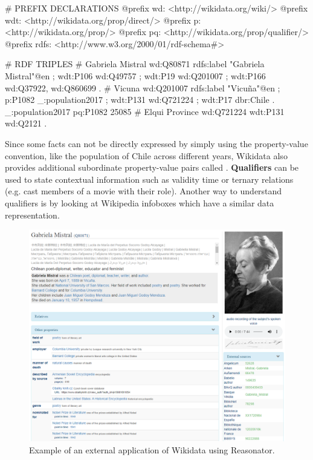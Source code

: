 \begin{sparqlcode}[%
    caption=Set of RDF triples about Gabriela Mistral in Wikidata., 
    label=lst:wikidataRdfExample]
# PREFIX DECLARATIONS
@prefix wd: <http://wikidata.org/wiki/>
@prefix wdt: <http://wikidata.org/prop/direct/>
@prefix p: <http://wikidata.org/prop/>
@prefix pq: <http://wikidata.org/prop/qualifier/>
@prefix rdfs: <http://www.w3.org/2000/01/rdf-schema#>

# RDF TRIPLES
# Gabriela Mistral
wd:Q80871 rdfs:label "Gabriela Mistral"@en ;
    wdt:P106 wd:Q49757 ;
    wdt:P19 wd:Q201007 ;
    wdt:P166 wd:Q37922, wd:Q860699 .
# Vicuna
wd:Q201007 rdfs:label "Vicuña"@en ;
    p:P1082 _:population2017 ;
    wdt:P131 wd:Q721224 ;
    wdt:P17 dbr:Chile .
_:population2017 pq:P1082 25085
# Elqui Province
wd:Q721224 wdt:P131 wd:Q2121 .
\end{sparqlcode}

Since some facts can not be directly expressed by simply using the property-value convention, 
like the population of Chile across different years, Wikidata also provides additional 
subordinate property-value pairs called . \textbf{Qualifiers} can be used 
to state contextual information such as validity time or ternary relations (e.g. cast members of 
a movie with their role). Another way to understand qualifiers is by looking at Wikipedia 
infoboxes which have a similar data representation.

\begin{figure}[!h]
    \centering
    \includegraphics[scale=.5]{imagenes/2_theorical_framework/wikidataReasonatorExample.PNG}
    \caption{Example of an external application of Wikidata using Reasonator.}
    \label{fig:wikidataReasonator}
\end{figure}

